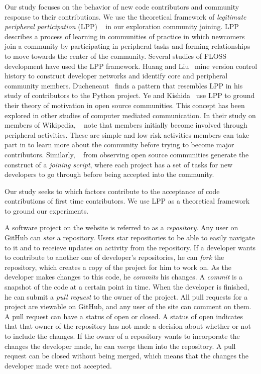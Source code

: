 \documentclass{iitthesis}
\begin{document}
 \label{sec:communities}
Our study focuses on the behavior of new code contributors and community
response to their contributions. We use the theoretical framework of
\textit{legitimate peripheral participation} (LPP) ~\cite{lave_situated_1991} in
our exploration community joining. LPP describes a process of learning in
communities of practice in which newcomers join a community by participating in
peripheral tasks and forming relationships to move towards the center of the
community. Several studies of FLOSS development have used the LPP framework.
Huang and Liu~\cite{huang_mining_2005} mine version control history to construct
developer networks and identify core and peripheral community members.
Ducheneaut~\cite{ducheneaut_socialization_2005} finds a pattern that resembles
LPP in his study of contributors to the Python project. Ye and
Kishida~\cite{ye_toward_2003} use LPP to ground their theory of motivation in
open source communities. This concept has been explored in other studies of
computer mediated communication.  In their study on members of Wikipedia,
~\cite{bryant_becoming_2005} note that members initially become involved through
peripheral activities. These are simple and low risk activities members can take
part in to learn more about the community before trying to become major
contributors. Similarly, ~\cite{von_krogh_community_2003} from observing open
source communities generate the construct of a \textit{joining script}, where
each project has a set of tasks for new developers to go through before being
accepted into the community.

Our study seeks to which factors contribute to the acceptance of code
contributions of first time contributors. We use LPP as a theoretical framework
to ground our experiments.

 \label{chap:methods}

 \label{sec:terms}

A software project on the website is referred to as a \textit{repository}. Any
user on GitHub can \textit{star} a repository. Users star repositories to be
able to easily navigate to it and to receieve updates on activity from the
repository. If a developer wants to contribute to another one of developer's
repositories, he can \textit{fork} the repository, which creates a copy of the
project for him to work on. As the developer makes changes to this code, he
\textit{commits} his changes. A \textit{commit} is a snapshot of the code at a
certain point in time. When the developer is finished, he can submit a
\textit{pull request} to the owner of the project. All pull requests for a
project are viewable on GitHub, and any user of the site can comment on them. A
pull request can have a status of open or closed. A status of open indicates
that that owner of the repository has not made a decision about whether or not
to include the changes. If the owner of a repository wants to incorporate the
changes the developer made, he can \textit{merge} them into the repository. A
pull request can be closed without being merged, which means that the changes
the developer made were not accepted.
\end{document}
